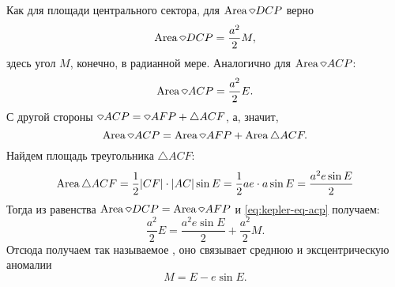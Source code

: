 Как для площади центрального сектора, для $\area \sector DCP$ верно
\begin{equation*}
    \area \sector DCP = \frac{a^2}{2} M,
\end{equation*}
здесь угол $M$, конечно, в радианной мере. Аналогично для $\area \sector ACP$:
\begin{equation*}
    \area \sector ACP = \frac{a^2}{2} E.
\end{equation*}
С другой стороны $\sector ACP = \sector AFP + \triangle ACF$, а, значит,
\begin{equation}
    \area \sector ACP = \area\sector AFP + \area\triangle ACF.
    \label{eq:kepler-eq-acp}
\end{equation}
Найдем площадь треугольника $\triangle ACF$:
\begin{equation*}
    \operatorname{Area} \triangle ACF = \frac{1}{2} |CF| \cdot |AC| \sin E = \frac{1}{2} a e \cdot a \sin E =  \frac{a^2 e\sin E}{2}
\end{equation*}
Тогда из равенства $\area \sector DCP = \area \sector AFP$ и \eqref{eq:kepler-eq-acp} получаем:
\begin{equation*}
    \frac{a^2}{2} E = \frac{a^2 e\sin E}{2} + \frac{a^2}{2} M.
\end{equation*}
Отсюда получаем так называемое , оно связывает среднюю и эксцентрическую аномалии
\begin{equation}\label{eq:kepler-eq}
    M = E - e \sin E.
\end{equation}


